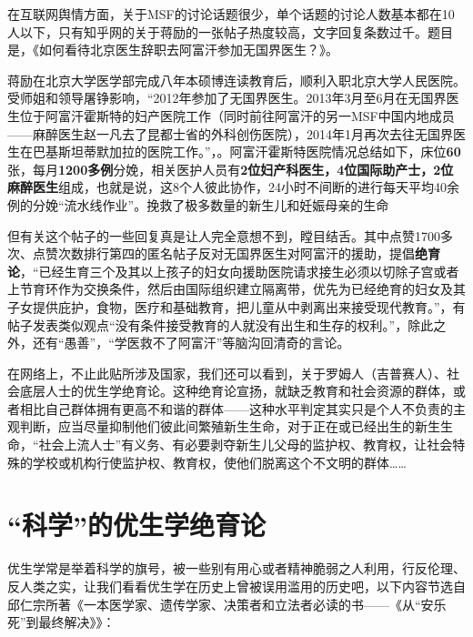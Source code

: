 在互联网舆情方面，关于MSF的讨论话题很少，单个话题的讨论人数基本都在10人以下，只有知乎网的关于蒋励的一张帖子热度较高，文字回复条数过千。题目是，《如何看待北京医生辞职去阿富汗参加无国界医生？》。\cite{kandaijiangli}

蒋励在北京大学医学部完成八年本硕博连读教育后，顺利入职北京大学人民医院。受师姐和领导屠铮影响，“2012年参加了无国界医生。2013年3月至6月在无国界医生位于阿富汗霍斯特的妇产医院工作（同时前往阿富汗的另一MSF中国内地成员——麻醉医生赵一凡去了昆都士省的外科创伤医院），2014年1月再次去往无国界医生在巴基斯坦蒂默加拉的医院工作。”，\cite{jiangli}。阿富汗霍斯特医院情况总结如下，床位\textbf{60}张，每月\textbf{1200多例}分娩，相关医护人员有\textbf{2位妇产科医生，4位国际助产士，2位麻醉医生}组成，也就是说，这8个人彼此协作，24小时不间断的进行每天平均40余例的分娩“流水线作业”。挽救了极多数量的新生儿和妊娠母亲的生命

但有关这个帖子的一些回复真是让人完全意想不到，瞠目结舌。其中点赞1700多次、点赞次数排行第四的匿名帖子反对无国界医生对阿富汗的援助，提倡\textbf{绝育论}，“已经生育三个及其以上孩子的妇女向援助医院请求接生必须以切除子宫或者上节育环作为交换条件，然后由国际组织建立隔离带，优先为已经绝育的妇女及其子女提供庇护，食物，医疗和基础教育，把儿童从中剥离出来接受现代教育。”，有帖子发表类似观点“没有条件接受教育的人就没有出生和生存的权利。”，除此之外，还有“愚善”，“学医救不了阿富汗”等脑沟回清奇的言论。

在网络上，不止此贴所涉及国家，我们还可以看到，关于罗姆人（吉普赛人）、社会底层人士的优生学绝育论。这种绝育论宣扬，就缺乏教育和社会资源的群体，或者相比自己群体拥有更高不和谐的群体——这种水平判定其实只是个人不负责的主观判断，应当尽量抑制他们彼此间繁殖新生生命，对于正在或已经出生的新生生命，“社会上流人士”有义务、有必要剥夺新生儿父母的监护权、教育权，让社会特殊的学校或机构行使监护权、教育权，使他们脱离这个不文明的群体……

\section{“科学”的优生学绝育论}

优生学常是举着科学的旗号，被一些别有用心或者精神脆弱之人利用，行反伦理、反人类之实，让我们看看优生学在历史上曾被误用滥用的历史吧，以下内容节选自邱仁宗所著《一本医学家、遗传学家、决策者和立法者必读的书——《从“安乐死”到最终解决》》\cite{yousheng}：

